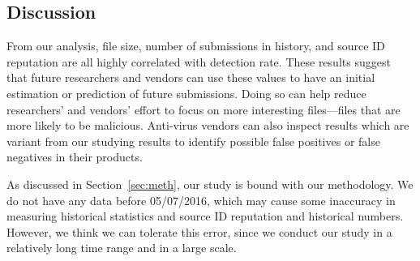 \subsection{Discussion}

From our analysis, file size, number of submissions in history, and source ID reputation
are all highly correlated with detection rate. 
These results suggest that future researchers and vendors can use these values to have an initial estimation or prediction of future submissions.
Doing so can help reduce researchers' and vendors' effort to focus on more interesting files---files that are more likely to be malicious.
Anti-virus vendors can also inspect results which are variant from our studying results 
to identify possible false positives or false negatives in their products. 


As discussed in Section~\ref{sec:meth}, our study is bound with our methodology.
We do not have any data before 05/07/2016, 
which may cause some inaccuracy in measuring historical statistics and 
source ID reputation and historical numbers.
However, we think we can tolerate this error, 
since we conduct our study in a relatively long time range and in a large scale. 
